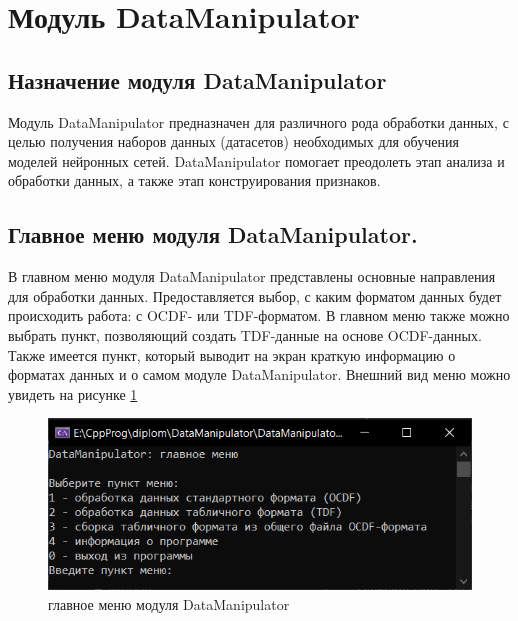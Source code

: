 \sectionbreak \section{  \standartTitleFont
  Модуль DataManipulator
} \label{sec:DataManipulator}

\subsection{ \standartTitleFont
  Назначение модуля DataManipulator
} \label{subsec:targerDM}

{\standartFont

  \par Модуль DataManipulator предназначен для различного рода обработки данных, с целью получения наборов данных (датасетов) необходимых для обучения моделей нейронных сетей. DataManipulator помогает преодолеть этап анализа и обработки данных, а также этап конструирования признаков.

  \par
}

\subsection{ \standartTitleFont
  Главное меню модуля DataManipulator.
} \label{subsec:MainMenuDM}

{\standartFont

  \par В главном меню модуля DataManipulator представлены основные направления для обработки данных. Предоставляется выбор, с каким форматом данных будет происходить работа: с OCDF- или TDF-форматом. В главном меню также можно выбрать пункт, позволяющий создать TDF-данные на основе OCDF-данных. Также имеется пункт, который выводит на экран краткую информацию о форматах данных и о самом модуле DataManipulator. Внешний вид меню можно увидеть на рисунке \ref{fig:mainMenu}

  \par

  \begin{figure}[H]
    \centering
    \includegraphics{images/forDataManipulator/mainMenu.png}
    \caption{главное меню модуля DataManipulator}
    \label{fig:mainMenu}
  \end{figure}

}

